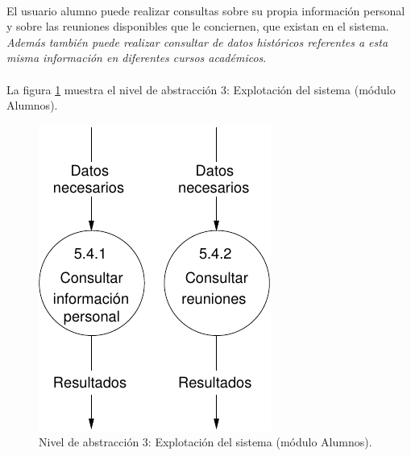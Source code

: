 \paragraph{}El usuario alumno puede realizar consultas sobre su propia
información personal y sobre las reuniones disponibles que le conciernen, que
existan en el sistema.
\textit{Además también puede realizar consultar de datos históricos referentes a
esta misma información en diferentes cursos académicos}.

\paragraph{}La figura \ref{diagramaNivel3-ExplotacionSistema-alumnos}
muestra el nivel de abstracción 3: Explotación del sistema (módulo Alumnos).

  \begin{figure}[!ht]
    \begin{center}
      \includegraphics[]{08.Analisis_Funcional/8.2.DFDs/Niveles/Nivel3/Alumnos/ExplotacionSistema/Diagramas/nivel3-ExplotacionSistema.pdf}
      \caption{Nivel de abstracción 3: Explotación del sistema (módulo Alumnos).}
      \label{diagramaNivel3-ExplotacionSistema-alumnos}
    \end{center}
  \end{figure}

